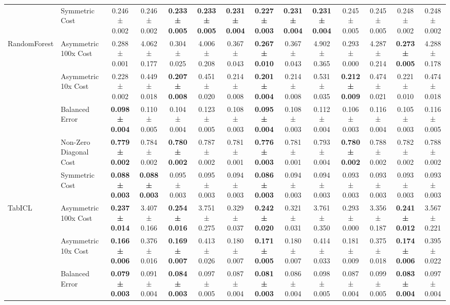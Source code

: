 \begin{table}[H]
{\begin{tabular}{llcccccccccccc}
 & Symmetric Cost & 0.246 ± 0.002 & 0.246 ± 0.002 & \textbf{0.233 ± 0.005} & \textbf{0.233 ± 0.005} & \textbf{0.231 ± 0.004} & \textbf{0.227 ± 0.003} & \textbf{0.231 ± 0.004} & \textbf{0.231 ± 0.004} & 0.245 ± 0.005 & 0.245 ± 0.005 & 0.248 ± 0.002 & 0.248 ± 0.002 \\
\cline{1-14}
\multirow[t]{5}{*}{RandomForest} & Asymmetric 100x Cost & 0.288 ± 0.001 & 4.062 ± 0.177 & 0.304 ± 0.025 & 4.006 ± 0.208 & 0.367 ± 0.043 & \textbf{0.267 ± 0.010} & 0.367 ± 0.043 & 4.902 ± 0.365 & 0.293 ± 0.000 & 4.287 ± 0.214 & \textbf{0.273 ± 0.005} & 4.288 ± 0.178 \\
 & Asymmetric 10x Cost & 0.228 ± 0.002 & 0.449 ± 0.018 & \textbf{0.207 ± 0.008} & 0.451 ± 0.020 & 0.214 ± 0.008 & \textbf{0.201 ± 0.004} & 0.214 ± 0.008 & 0.531 ± 0.035 & \textbf{0.212 ± 0.009} & 0.474 ± 0.021 & 0.221 ± 0.010 & 0.474 ± 0.018 \\
 & Balanced Error & \textbf{0.098 ± 0.004} & 0.110 ± 0.005 & 0.104 ± 0.004 & 0.123 ± 0.005 & 0.108 ± 0.003 & \textbf{0.095 ± 0.004} & 0.108 ± 0.003 & 0.112 ± 0.004 & 0.106 ± 0.003 & 0.116 ± 0.004 & 0.105 ± 0.003 & 0.116 ± 0.005 \\
 & Non-Zero Diagonal Cost & \textbf{0.779 ± 0.002} & 0.784 ± 0.002 & \textbf{0.780 ± 0.002} & 0.787 ± 0.002 & 0.781 ± 0.001 & \textbf{0.776 ± 0.003} & 0.781 ± 0.001 & 0.793 ± 0.004 & \textbf{0.780 ± 0.002} & 0.788 ± 0.002 & 0.782 ± 0.002 & 0.788 ± 0.002 \\
 & Symmetric Cost & \textbf{0.088 ± 0.003} & \textbf{0.088 ± 0.003} & 0.095 ± 0.003 & 0.095 ± 0.003 & 0.094 ± 0.003 & \textbf{0.086 ± 0.003} & 0.094 ± 0.003 & 0.094 ± 0.003 & 0.093 ± 0.003 & 0.093 ± 0.003 & 0.093 ± 0.003 & 0.093 ± 0.003 \\
\cline{1-14}
\multirow[t]{5}{*}{TabICL} & Asymmetric 100x Cost & \textbf{0.237 ± 0.014} & 3.407 ± 0.166 & \textbf{0.254 ± 0.016} & 3.751 ± 0.275 & 0.329 ± 0.037 & \textbf{0.242 ± 0.020} & 0.321 ± 0.031 & 3.761 ± 0.350 & 0.293 ± 0.000 & 3.356 ± 0.187 & \textbf{0.241 ± 0.012} & 3.567 ± 0.221 \\
 & Asymmetric 10x Cost & \textbf{0.166 ± 0.006} & 0.376 ± 0.016 & \textbf{0.169 ± 0.007} & 0.413 ± 0.026 & 0.180 ± 0.007 & \textbf{0.171 ± 0.005} & 0.180 ± 0.007 & 0.414 ± 0.033 & 0.181 ± 0.009 & 0.375 ± 0.018 & \textbf{0.174 ± 0.006} & 0.395 ± 0.022 \\
 & Balanced Error & \textbf{0.079 ± 0.003} & 0.091 ± 0.004 & \textbf{0.084 ± 0.003} & 0.097 ± 0.005 & 0.087 ± 0.004 & \textbf{0.081 ± 0.003} & 0.086 ± 0.004 & 0.098 ± 0.005 & 0.087 ± 0.004 & 0.099 ± 0.005 & \textbf{0.083 ± 0.004} & 0.097 ± 0.004 \\

\end{tabular}}
\end{table}
